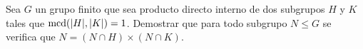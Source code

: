 \begin{ejercicio}
    Sea $G$ un grupo finito que sea producto directo interno de dos subgrupos $H$ y $K$ tales que $\operatorname{mcd}(|H|,|K|)=1$. Demostrar que para todo subgrupo $N\leq G$ se verifica que $N=(N\cap H)\times (N\cap K)$.\\

\end{ejercicio}

